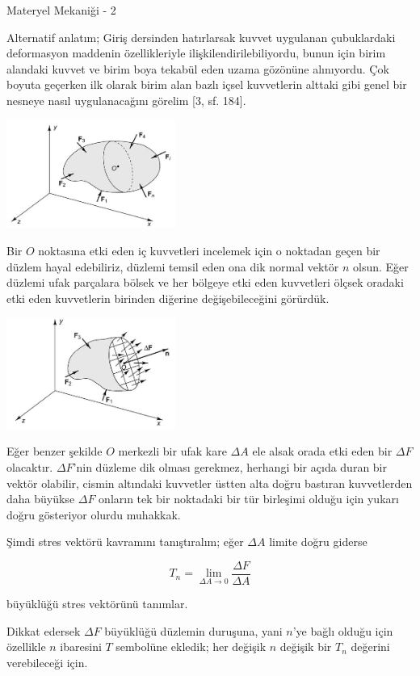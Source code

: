 \documentclass[12pt,fleqn]{article}\usepackage{../../common}
\begin{document}
Materyel Mekaniği - 2

Alternatif anlatım; Giriş dersinden hatırlarsak kuvvet uygulanan çubuklardaki
deformasyon maddenin özellikleriyle ilişkilendirilebiliyordu, bunun için birim
alandaki kuvvet ve birim boya tekabül eden uzama gözönüne alınıyordu. Çok boyuta
geçerken ilk olarak birim alan bazlı içsel kuvvetlerin alttaki gibi genel bir
nesneye nasıl uygulanacağını görelim [3, sf. 184].

\includegraphics[width=15em]{phy_020_strs_02_16.jpg}

Bir $O$ noktasına etki eden iç kuvvetleri incelemek için o noktadan geçen bir
düzlem hayal edebiliriz, düzlemi temsil eden ona dik normal vektör $n$ olsun.
Eğer düzlemi ufak parçalara bölsek ve her bölgeye etki eden kuvvetleri ölçsek
oradaki etki eden kuvvetlerin birinden diğerine değişebileceğini görürdük.

\includegraphics[width=15em]{phy_020_strs_02_17.jpg}

Eğer benzer şekilde $O$ merkezli bir ufak kare $\Delta A$ ele alsak orada etki
eden bir $\Delta F$ olacaktır. $\Delta F$'nin düzleme dik olması gerekmez,
herhangi bir açıda duran bir vektör olabilir, cismin altındaki kuvvetler üstten
alta doğru bastıran kuvvetlerden daha büyükse $\Delta F$ onların tek bir
noktadaki bir tür birleşimi olduğu için yukarı doğru gösteriyor olurdu muhakkak.

Şimdi stres vektörü kavramını tanıştıralım; eğer $\Delta A$ limite doğru giderse

$$
T_n = \lim_{\Delta A \to 0} \frac{\Delta F}{\Delta A}
$$

büyüklüğü stres vektörünü tanımlar.

Dikkat edersek $\Delta F$ büyüklüğü düzlemin duruşuna, yani $n$'ye bağlı olduğu
için özellikle $n$ ibaresini $T$ sembolüne ekledik; her değişik $n$ değişik bir
$T_n$ değerini verebileceği için.
\end{document}
